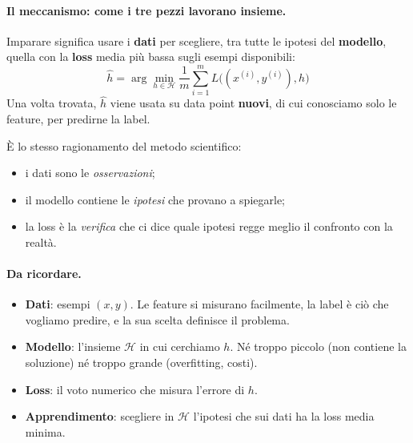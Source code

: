 \paragraph*{Il meccanismo: come i tre pezzi lavorano insieme.}
Imparare significa usare i \textbf{dati} per scegliere, tra tutte le ipotesi del \textbf{modello}, quella con la \textbf{loss} media più bassa sugli esempi disponibili:
\[
    \hat{h} = \arg\min_{h \in \mathcal{H}} \frac{1}{m}\sum_{i=1}^{m} L\big((x^{(i)},y^{(i)}),h\big)
\]
Una volta trovata, $\hat{h}$ viene usata su data point \textbf{nuovi}, di cui conosciamo solo le feature, per predirne la label.

È lo stesso ragionamento del metodo scientifico:
\begin{itemize}
    \item i dati sono le \emph{osservazioni};
    \item il modello contiene le \emph{ipotesi} che provano a spiegarle;
    \item la loss è la \emph{verifica} che ci dice quale ipotesi regge meglio il confronto con la realtà.
\end{itemize}

\paragraph*{Da ricordare.}
\begin{itemize}
    \item \textbf{Dati}: esempi $(x, y)$. Le feature si misurano facilmente, la label è ciò che vogliamo predire, e la sua scelta definisce il problema.
    \item \textbf{Modello}: l'insieme $\mathcal{H}$ in cui cerchiamo $h$. Né troppo piccolo (non contiene la soluzione) né troppo grande (overfitting, costi).
    \item \textbf{Loss}: il voto numerico che misura l'errore di $h$.
    \item \textbf{Apprendimento}: scegliere in $\mathcal{H}$ l'ipotesi che sui dati ha la loss media minima.
\end{itemize}